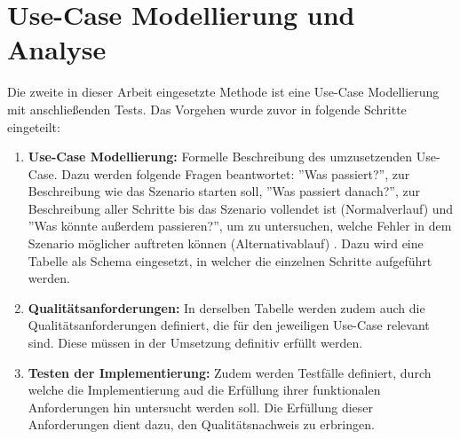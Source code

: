 \section{Use-Case Modellierung und Analyse}

Die zweite in dieser Arbeit eingesetzte Methode ist eine Use-Case Modellierung mit anschließenden Tests. Das Vorgehen wurde zuvor in folgende Schritte eingeteilt:
\begin{enumerate}
    \item \textbf{Use-Case Modellierung:} Formelle Beschreibung des umzusetzenden Use-Case. Dazu werden folgende Fragen beantwortet: ''Was passiert?'', zur Beschreibung wie das Szenario starten soll, ''Was passiert danach?'', zur Beschreibung aller Schritte bis das Szenario vollendet ist (Normalverlauf) und ''Was könnte außerdem passieren?'', um zu untersuchen, welche Fehler in dem Szenario möglicher auftreten können (Alternativablauf) \cite[Vgl.][S. 52]{Rosenberg2007}. Dazu wird eine Tabelle als Schema eingesetzt, in welcher die einzelnen Schritte aufgeführt werden.
    \item \textbf{Qualitätsanforderungen:} In derselben Tabelle werden zudem auch die Qualitätsanforderungen definiert, die für den jeweiligen Use-Case relevant sind. Diese müssen in der Umsetzung definitiv erfüllt werden.
    \item \textbf{Testen der Implementierung:} Zudem werden Testfälle definiert, durch welche die Implementierung aud die Erfüllung ihrer funktionalen Anforderungen hin untersucht werden soll. Die Erfüllung dieser Anforderungen dient dazu, den Qualitätsnachweis zu erbringen.
\end{enumerate}